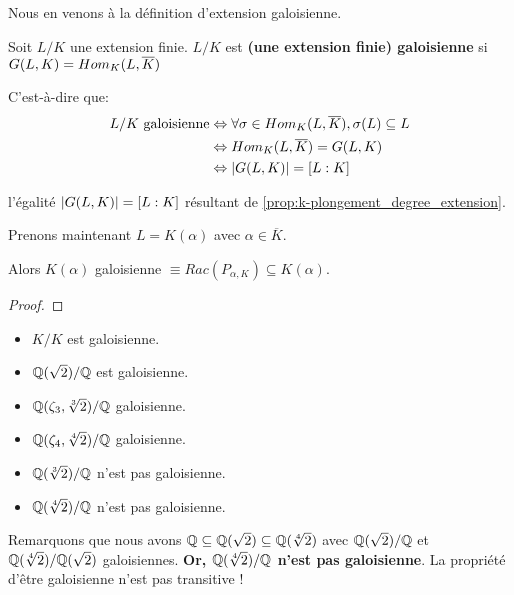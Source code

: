 Nous en venons à la définition d'extension galoisienne.

\begin{definition}
	Soit $L/K$ une extension finie.
	$L/K$ est \textbf{(une extension finie) galoisienne} si $G(L, K) =
	Hom_{K}(L, \overline{K})$
\end{definition}

C'est-à-dire que:
\begin{align*}
	L/K \text{ galoisienne}
	& \Leftrightarrow \forall \sigma \in Hom_{K}(L, \overline{K}), \sigma(L) \subseteq L \\
	& \Leftrightarrow Hom_{K}(L, \overline{K}) = G(L, K) \\
	& \Leftrightarrow |G(L, K)| = [L : K]
\end{align*}

l'égalité $|G(L, K)| = [L : K]$ résultant
de \ref{prop:k-plongement_degree_extension}.

\begin{proposition}
	Prenons maintenant $L = K(\alpha)$ avec $\alpha \in \overline{K}$.

	Alors $K(\alpha)$ galoisienne $\equiv Rac(P_{\alpha, K}) \subseteq K(\alpha)$.
\end{proposition}

\ifdefined\outputproof
\begin{proof}

\end{proof}
\fi

\begin{exemple} [Exercice]
	\begin{itemize}
		\item $K/K$ est galoisienne.
		\item $\mathbb{Q}(\sqrt{2})/\mathbb{Q}$ est galoisienne.
		\item $\mathbb{Q}(\zeta_{3}, \sqrt[3]{2})/\mathbb{Q}$ galoisienne.
		\item $\mathbb{Q}(\zeta_{4}, \sqrt[4]{2})/\mathbb{Q}$ galoisienne.
		\item $\mathbb{Q}(\sqrt[3]{2})/\mathbb{Q}$ n'est pas galoisienne.
		\item $\mathbb{Q}(\sqrt[4]{2})/\mathbb{Q}$ n'est pas galoisienne.
	\end{itemize}
\end{exemple}

Remarquons que nous avons $\mathbb{Q} \subseteq \mathbb{Q}(\sqrt{2}) \subseteq
\mathbb{Q}(\sqrt[4]{2})$ avec $\mathbb{Q}(\sqrt{2})/\mathbb{Q}$ et
$\mathbb{Q}(\sqrt[4]{2})/\mathbb{Q}(\sqrt{2})$ galoisiennes.
\textbf{Or, $\mathbb{Q}(\sqrt[4]{2})/\mathbb{Q}$ n'est pas galoisienne}. La
propriété d'être galoisienne n'est pas transitive !

